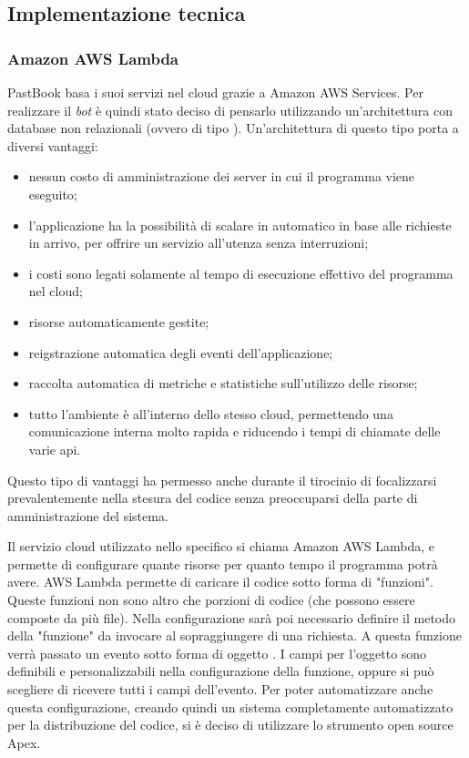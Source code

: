 \subsection{Implementazione tecnica}

\subsubsection{Amazon AWS Lambda}
PastBook basa i suoi servizi nel \gls{cloud} grazie a Amazon AWS Services.
Per realizzare il \textit{bot} è quindi stato deciso di pensarlo utilizzando
un'architettura  con database non relazionali
(ovvero di tipo ). Un'architettura di questo tipo porta a
diversi vantaggi:

\begin{itemize}

  \item nessun costo di amministrazione dei server in cui il programma viene
eseguito;
  \item l'applicazione ha la possibilità di scalare in automatico in base alle
richieste in arrivo, per offrire un servizio all'utenza senza interruzioni;
  \item i costi sono legati solamente al tempo di esecuzione effettivo del
programma nel \gls{cloud};
  \item risorse automaticamente gestite;
  \item reigstrazione automatica degli eventi dell'applicazione;
  \item raccolta automatica di metriche e statistiche sull'utilizzo delle
risorse;
  \item tutto l'ambiente è all'interno dello stesso \gls{cloud}, permettendo
una comunicazione interna molto rapida e riducendo i tempi di chiamate delle
varie \gls{api}.
\end{itemize}

Questo tipo di vantaggi ha permesso anche durante il tirocinio di focalizzarsi
prevalentemente nella stesura del codice senza preoccuparsi della parte di
amministrazione del sistema.

Il servizio \gls{cloud} utilizzato nello specifico si chiama Amazon AWS
Lambda, e permette di configurare quante risorse per quanto tempo il programma
potrà avere.
AWS Lambda permette di caricare il codice sotto forma di "funzioni". Queste
funzioni non sono altro che porzioni di codice (che possono essere composte da
più file).
Nella configurazione sarà poi necessario definire il metodo della
"funzione" da invocare al sopraggiungere di una richiesta. A questa funzione
verrà passato un evento sotto forma di oggetto
. I campi per l'oggetto sono
definibili e personalizzabili nella configurazione della funzione, oppure si può
scegliere di ricevere tutti i campi dell'evento.
Per poter automatizzare anche questa configurazione, creando
quindi un sistema completamente automatizzato per la distribuzione del
codice, si è deciso di utilizzare lo strumento open source Apex.

